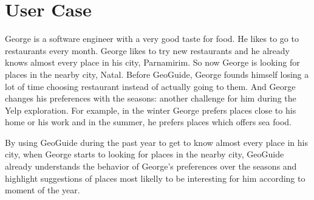 \chapter{User Case}
\label{chap:case}


George is a software engineer with a very good taste for food. He likes to go to restaurants every month. George likes to try new restaurants and he already knows almost every place in his city, Parnamirim. So now George is looking for places in the nearby city, Natal. Before GeoGuide, George founds himself losing a lot of time choosing restaurant instead of actually going to them. And George changes his preferences with the seasons: another challenge for him during the Yelp exploration. For example, in the winter George prefers places close to his home or his work and in the summer, he prefers places which offers sea food.

By using GeoGuide during the past year to get to know almost every place in his city, when George starts to looking for places in the nearby city, GeoGuide already understands the behavior of George's preferences over the seasons and highlight suggestions of places most likelly to be interesting for him according to moment of the year.